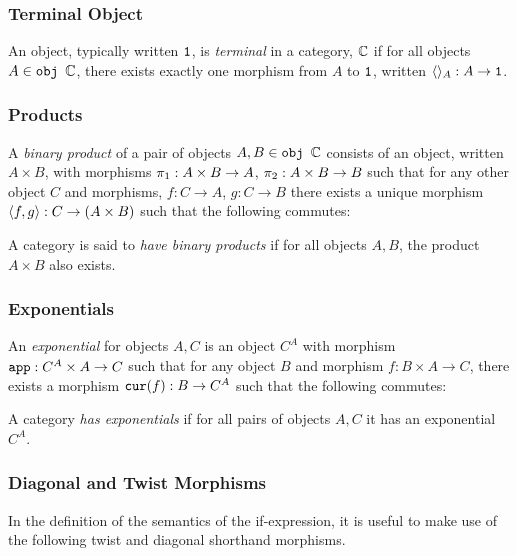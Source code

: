 \documentclass{Report}
\begin{document}
\subsubsection{Terminal Object}
An object, typically written $\texttt{1}$, is \textit{terminal} in a category, $\mathbb{C}$ if for all objects $A\in\texttt{obj }\mathbb{C}$, there exists exactly one morphism from $A$ to $\texttt{1}$, written $\langle\rangle_{A}: A \rightarrow \texttt{1}$.

\subsubsection{Products}
A \textit{binary product} of a pair of objects $A, B\in\texttt{obj }\mathbb{C}$ consists of an object, written $A \times B$, with morphisms $\pi_1: A\times B\rightarrow A$, $\pi_2: A\times B \rightarrow B$ such that for any other object $C$ and morphisms, $f: C\rightarrow A$, $g: C\rightarrow B$ there exists a unique morphism $\langle f, g\rangle: C \rightarrow (A\times B)$ such that the following commutes:
{\centering
{}
}

A category is said to \textit{have binary products} if for all objects $A, B$, the product $A\times B$ also exists.

\subsubsection{Exponentials}
An \textit{exponential} for objects $A, C$ is an object $C^A$ with morphism $\texttt{app}: C^A\times A \rightarrow C$ such that for any object $B$ and morphism $f: B\times A \rightarrow C$, there exists a morphism $\texttt{cur}(f): B \rightarrow C^A$ such that the following commutes:

{\centering
{}}

A category \textit{has exponentials} if for all pairs of objects $A, C$ it has an exponential $C^A$.

\subsubsection{Diagonal and Twist Morphisms}
In the definition of the semantics of the if-expression, it is useful to make use of the following twist and diagonal shorthand morphisms.
\end{document}
